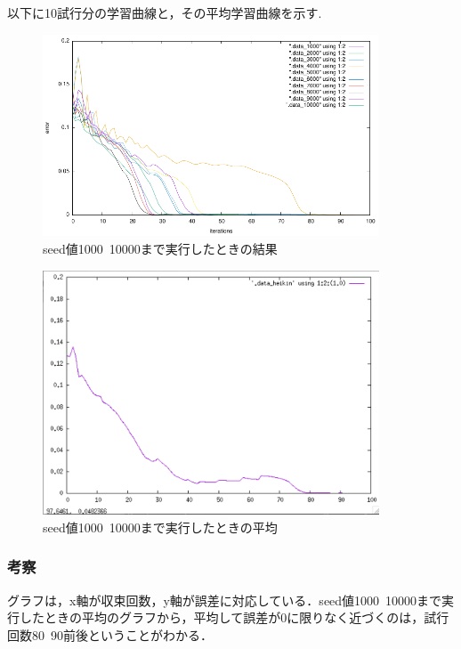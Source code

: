 以下に10試行分の学習曲線と，その平均学習曲線を示す.

\begin{figure}[h]
 \begin{center}
  \includegraphics[width=10.0cm]{figs/level2/iterations_vs_error_ave.pdf}
  \caption{seed値1000~10000まで実行したときの結果}
  \label{fig:level2}
 \end{center}
\end{figure}

\begin{figure}[h]
 \begin{center}
  \includegraphics[width=10.0cm]{figs/level2/heikin.pdf}
  \caption{seed値1000~10000まで実行したときの平均}
  \label{fig:level2}
 \end{center}
\end{figure}


\subsubsection{考察}

グラフは，x軸が収束回数，y軸が誤差に対応している．seed値1000~10000まで実行したときの平均のグラフから，平均して誤差が0に限りなく近づくのは，試行回数80~90前後ということがわかる．








